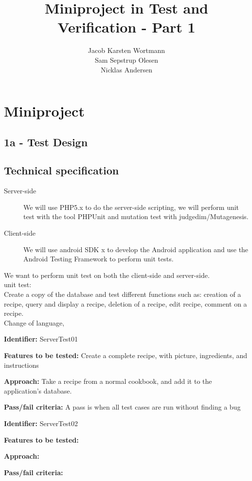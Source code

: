 \documentclass[a4paper,12pt]{memoir}
\title{Miniproject in Test and Verification - Part 1}
\author{Jacob Karsten Wortmann\\Sam Sepstrup Olesen\\Nicklas Andersen}
\newcommand{\testdesign}[4]
{
\begin{framed}
\begin{description}
\item \textbf{Identifier:} #1
\item \textbf{Features to be tested:} #2
\item \textbf{Approach:} #3
\item \textbf{Pass/fail criteria:} #4
\end{description}
\end{framed}
}
\begin{document}
\maketitle
\chapter*{Miniproject}
\section*{1a - Test Design}
\section{Technical specification}
\begin{description}
    \item[Server-side]
        We will use PHP5.x to do the server-side scripting,
        we will perform unit test with the tool PHPUnit and mutation test with judgedim/Mutagenesis.
    \item[Client-side]
        We will use android SDK x to develop the Android application and use the Android Testing Framework to perform unit tests.
\end{description}

We want to perform unit test on both the client-side and server-side.\\
unit test:\\
Create a copy of the database and test different functions such as: creation of a recipe, query and display a recipe, deletion of a recipe, edit recipe, comment on a recipe.\\
Change of language, 


\testdesign
{ServerTest01} %
{Create a complete recipe, with picture, ingredients, and instructions} %
{Take a recipe from a normal cookbook, and add it to the application's database.} %
{A pass is when all test cases are run without finding a bug} %

\testdesign
{ServerTest02} %
{} %
{} %
{} %
\end{document}
